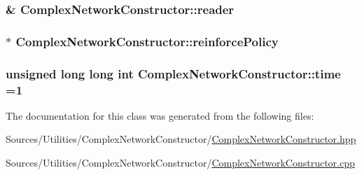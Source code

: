 \hypertarget{class_complex_network_constructor_ad223ad7e464ff159d91a89deb4e943cc}{
\subsubsection[{reader}]{\& Complex\+Network\+Constructor\+::reader\hspace{0.3cm}{\ttfamily [private]}}}\label{class_complex_network_constructor_ad223ad7e464ff159d91a89deb4e943cc}
\hypertarget{class_complex_network_constructor_a1048d40ab65e87ad58267144642b66cd}{
\subsubsection[{reinforce\+Policy}]{$\ast$ Complex\+Network\+Constructor\+::reinforce\+Policy\hspace{0.3cm}{\ttfamily [private]}}}\label{class_complex_network_constructor_a1048d40ab65e87ad58267144642b66cd}
\hypertarget{class_complex_network_constructor_afc016404ca7dda4b05807e3ca004c308}{
\subsubsection[{time}]{\setlength{\rightskip}{0pt plus 5cm}unsigned long long int Complex\+Network\+Constructor\+::time =1\hspace{0.3cm}{\ttfamily [private]}}}\label{class_complex_network_constructor_afc016404ca7dda4b05807e3ca004c308}


The documentation for this class was generated from the following files\+:\begin{DoxyCompactItemize}
\item 
Sources/\+Utilities/\+Complex\+Network\+Constructor/\hyperlink{_complex_network_constructor_8hpp}{Complex\+Network\+Constructor.\+hpp}\item 
Sources/\+Utilities/\+Complex\+Network\+Constructor/\hyperlink{_complex_network_constructor_8cpp}{Complex\+Network\+Constructor.\+cpp}\end{DoxyCompactItemize}
